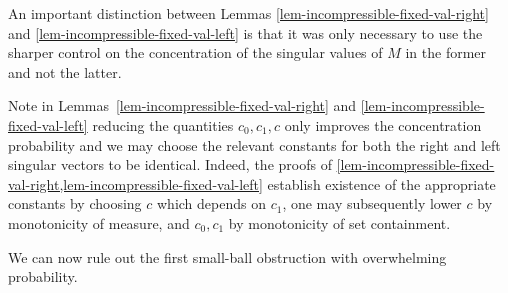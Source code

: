 \documentclass[11pt]{article}
\numberwithin{equation}{section}
\theoremstyle{remark}
\begin{document}
An important distinction between Lemmas \ref{lem-incompressible-fixed-val-right} and \ref{lem-incompressible-fixed-val-left} is that it was only necessary to use the sharper control on the concentration of the singular values of $M$ in the former and not the latter. 

Note in Lemmas~\ref{lem-incompressible-fixed-val-right} and \ref{lem-incompressible-fixed-val-left} reducing the quantities $c_0, c_1, c$ only improves the concentration probability and we may choose the relevant constants for both the right and left singular vectors to be identical. Indeed, the proofs of \cref{lem-incompressible-fixed-val-right,lem-incompressible-fixed-val-left} establish existence of the appropriate constants by choosing $c$ which depends on $c_1$, one may subsequently lower $c$ by monotonicity of measure, and $c_0, c_1$ by monotonicity of set containment.

We can now rule out the first small-ball obstruction with overwhelming probability.
\end{document}
